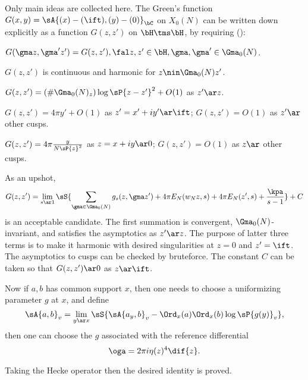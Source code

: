 \documentclass[article, a4paper, twoside]{universal}
\begin{document}
\begin{prf}
	Only main ideas are collected here. The Green's function $G(x,y)=\sA{(x)-(\ift),(y)-(0)}_{\bC}$ on $X_{0}(N)$ can be written down explicitly as a function $G(z,z')$ on $\bH\tms\bH$, by requiring (\cite[II.2.3]{GZ1986}):
	\begin{enr}
		\item $G(\gma z,\gma'z')=G(z,z'), \fal z,z'\in\bH, \gma,\gma'\in\Gma_{0}(N)$.
		\item $G(z,z')$ is continuous and harmonic for $z\nin\Gma_{0}(N)z'$.
		\item $G(z,z')=(\#\Gma_{0}(N)_{z})\log\sP{z-z'}^{2}+O(1)$ as $z'\ar z$.
		\item $G(z,z')=4\pi y'+O(1)$ as $z'=x'+iy'\ar\ift$; $G(z,z')=O(1)$ as $z'\ar$ other cusps.
		\item $G(z,z')=4\pi\frac{y}{N\sP{z}^{2}}$ as $z=x+iy\ar0$; $G(z,z')=O(1)$ as $z\ar$ other cusps.
	\end{enr}
	As an upshot,
	\[
		G(z,z')=\lim_{s\ar1}\sS{\sum_{\gma\in\Gma_{0}(N)}g_{s}(z,\gma z')+4\pi E_{N}(w_{N}z,s)+4\pi E_{N}(z',s)+\frac{\kpa}{s-1}}+C
	\]
	is an acceptable candidate. The first summation is convergent, $\Gma_{0}(N)$-invariant, and satisfies the asymptotics as $z'\ar z$. The purpose of latter three terms is to make it harmonic with desired singularities at $z=0$ and $z'=\ift$. The asymptotics to cusps can be checked by bruteforce. The constant $C$ can be taken so that $G(z,z')\ar 0$ as $z\ar \ift$.


	Now if $a,b$ has common support $x$, then one needs to choose a uniformizing parameter $g$ at $x$, and define
	\[
		\sA{a,b}_{v}=\lim_{y\ar x}\sS{\sA{a_{y},b}_{v}-\Ord_{x}(a)\Ord_{x}(b)\log\sP{g(y)}_{v}},
	\]
	then one can choose the $g$ associated with the reference differential
	\[
		\oga=2\pi i\eta(z)^{4}\dif{z}.
	\]

	Taking the Hecke operator then the desired identity is proved.
\end{prf}

\end{document}
